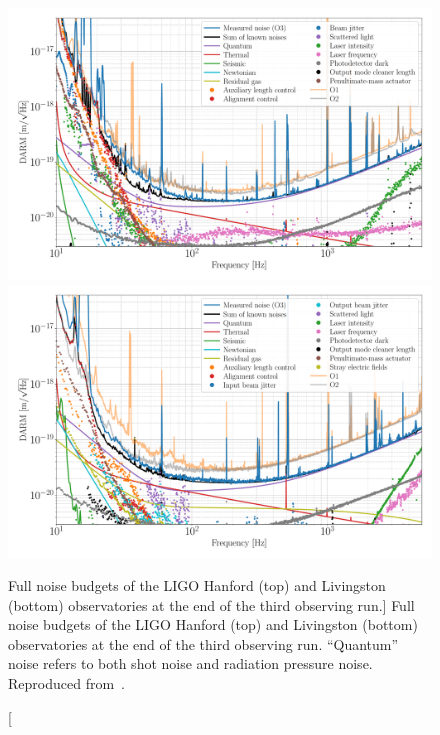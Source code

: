 \begin{figure}
  \centering
  \includegraphics[width=\textwidth]{figures/detectors/budget-lho.pdf}
  \includegraphics[width=\textwidth]{figures/detectors/budget-llo.pdf}
  \caption
  [Full noise budgets of the LIGO Hanford (top) and Livingston (bottom) observatories at the end of the third observing run.]
  {Full noise budgets of the LIGO Hanford (top) and Livingston (bottom) observatories at the end of the third observing run. ``Quantum'' noise refers to both shot noise and radiation pressure noise. Reproduced from~\protect\citet{Buikema_2020}.}
  \label{fig:detectors-budget}
\end{figure}

